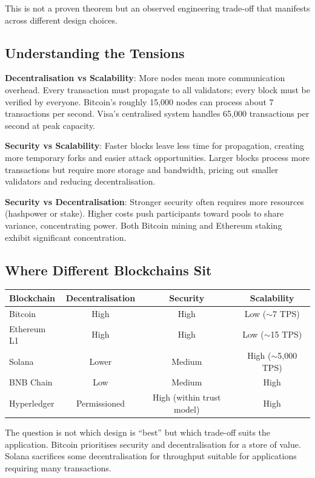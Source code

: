 \documentclass[11pt,a4paper]{article}
\begin{document}
This is not a proven theorem but an observed engineering trade-off that manifests across different design choices.

\subsection{Understanding the Tensions}

\textbf{Decentralisation vs Scalability}: More nodes mean more communication overhead. Every transaction must propagate to all validators; every block must be verified by everyone. Bitcoin's roughly 15,000 nodes can process about 7 transactions per second. Visa's centralised system handles 65,000 transactions per second at peak capacity.

\textbf{Security vs Scalability}: Faster blocks leave less time for propagation, creating more temporary forks and easier attack opportunities. Larger blocks process more transactions but require more storage and bandwidth, pricing out smaller validators and reducing decentralisation.

\textbf{Security vs Decentralisation}: Stronger security often requires more resources (hashpower or stake). Higher costs push participants toward pools to share variance, concentrating power. Both Bitcoin mining and Ethereum staking exhibit significant concentration.

\subsection{Where Different Blockchains Sit}

\begin{center}
\begin{tabular}{lccc}
\toprule
\textbf{Blockchain} & \textbf{Decentralisation} & \textbf{Security} & \textbf{Scalability} \\
\midrule
Bitcoin & High & High & Low ($\sim$7 TPS) \\
Ethereum L1 & High & High & Low ($\sim$15 TPS) \\
Solana & Lower & Medium & High ($\sim$5,000 TPS) \\
BNB Chain & Low & Medium & High \\
Hyperledger & Permissioned & High (within trust model) & High \\
\bottomrule
\end{tabular}
\end{center}

The question is not which design is ``best'' but which trade-off suits the application. Bitcoin prioritises security and decentralisation for a store of value. Solana sacrifices some decentralisation for throughput suitable for applications requiring many transactions.
\end{document}
